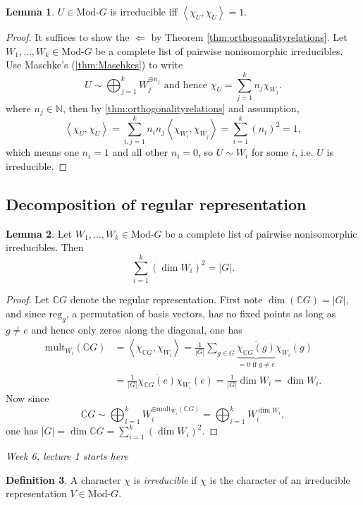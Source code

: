 \documentclass[a4paper]{article}
\newcommand{\mult}{\text{mult}}
\newcommand{\la}{\left\langle}
\newcommand{\ra}{\right\rangle}
\newcommand{\N}{\mathbb{N}}
\newcommand{\C}{\mathbb{C}}
\newcommand{\reg}{\text{reg}}
\newcommand{\Mod}{\text{Mod-}}
\theoremstyle{definition}
\newtheorem{defn}{Definition}[subsection]
\newtheorem{lemma}[defn]{Lemma}
\begin{document}
\begin{lemma}
\label{lemma:irrediffinnerprod1}
$U\in\Mod G$ is irreducible iff $\la\chi_U,\chi_U\ra=1$.
\end{lemma}
\begin{proof}
It suffices to show the $\Leftarrow$ by Theorem \ref{thm:orthogonalityrelations}. Let $W_1,\ldots,W_k\in\Mod G$ be a complete list of pairwise nonisomorphic irreducibles. Use Maschke's (\ref{thm:Maschkes}) to write
\[
U\sim\bigoplus_{j=1}^k W_j^{\oplus n_j}\text{ and hence }\chi_U=\sum_{j=1}^k n_j\chi_{W_j}.
\]
where $n_j\in\N$, then by \ref{thm:orthogonalityrelations} and assumption,
\[
\la\chi_U,\chi_U\ra=\sum_{i,j=1}^k n_in_j\la\chi_{W_i},\chi_{W_j}\ra=\sum_{i=1}^k (n_i)^2=1,
\] 
which means one $n_i=1$ and all other $n_i=0$, so $U\sim W_i$ for some $i$, i.e. $U$ is irreducible.
\end{proof}

\subsection{Decomposition of regular representation}
\begin{lemma}
\label{lemma:sumirreddimsqisordG}
Let $W_1,\ldots,W_k\in\Mod G$ be a complete list of pairwise nonisomorphic irreducibles. Then
\[
\sum_{i=1}^k(\dim W_i)^2=|G|.
\]
\end{lemma}
\begin{proof}
Let $\C G$ denote the regular representation. First note $\dim (\C G)=|G|$, and since $\reg_g$, a permutation of basis vectors, has no fixed points as long as $g\neq e$ and hence only zeros along the diagonal, one has
\[
\begin{aligned}
\mult_{W_i}(\C G)&=\la \chi_{\C G},\chi_{W_i}\ra=\frac{1}{|G|}\sum_{g\in G}\underbrace{\overline{\chi_{\C G}(g)}}_{=0\text{ if }g\neq e}\chi_{W_i}(g)\\
&=\frac{1}{|G|}\overline{\chi_{\C G}(e)}\chi_{W_i}(e)=\frac{1}{|G|}\dim W_i=\dim W_i.
\end{aligned}
\]
Now since
\[
\C G\sim\bigoplus_{i=1}^k W_i^{\oplus \mult_{W_i}(\C G)}=\bigoplus_{i=1}^k W_i^{\dim W_i},
\]
one has $|G|=\dim\C G=\sum_{i=1}^k(\dim W_i)^2$.
\end{proof}

\begin{flushright}
\textit{Week 6, lecture 1 starts here}
\end{flushright}

\begin{defn}
A character $\chi$ is \textit{irreducible} if $\chi$ is the character of an irreducible representation $V\in\Mod G$.
\end{defn}
\end{document}
